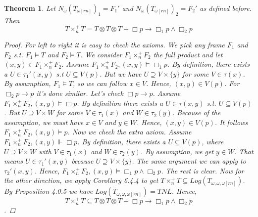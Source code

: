 \documentclass[12pt, a4paper]{scrartcl}
\newtheorem{theorem}[definition]{Theorem}
\begin{document}
    \begin{theorem}
        Let $N_\omega(T_{\omega[rn]})_1 = F_1'$ and $N_\omega(T_{\omega[rn]})_2 = F_2'$ as defined before. Then 
        $$T \times^+_n T = T \otimes T \otimes T + \Box p \rightarrow \Box_1 p \land \Box_2 p$$

        \begin{proof}
            For left to right it is easy to check the axioms. We pick any frame $F_1$ and $F_2$ s.t.
            $F_1 \vDash T$ and $F_2 \vDash T$. We consider $F_1 \times^+_n F_2$ the full product and let $(x,y) \in F_1 \times^+_n F_2$. \newline
            Assume $F_1 \times^+_n F_2,(x,y) \vDash \Box_1 p$. By definition, there exists a $U \in \tau_1'(x,y)$ s.t $U \subseteq V(p)$.
            But we have $U \supseteq V \times \{y\}$ for some $V \in \tau(x)$. By assumption, $F_1 \vDash T$, so we can follow $x \in V$. Hence, $(x,y) \in V(p)$. For $\Box_2p \rightarrow p$ it's done similar. \newline Let's check $\Box p \rightarrow p$.
            Assume $F_1 \times^+_n F_2,(x,y) \vDash \Box p$. By definition there exists a $U \in \tau(x,y)$ s.t. $U \subseteq V(p)$. But $U \supseteq V \times W$ for some $V \in \tau_1(x)$ and $W \in \tau_2(y)$.
            Because of the assumption, we must have $x \in V$ and $y \in W$. Hence, $(x,y) \in V(p)$. It follows $F_1 \times^+_n F_2,(x,y) \vDash p$. \newline
            Now we check the extra axiom.  Assume $F_1 \times^+_n F_2,(x,y) \Vdash \Box p$. By definition, there exists a $U \subseteq V(p)$, where $U \supseteq V \times W$ with $V \in \tau_1(x)$ and $W \in \tau_2(y)$. By assumption, we get $y \in W$. That means $U \in \tau_1'(x,y)$ 
            because $U \supseteq V \times \{y\}$. The same argument we can apply to $\tau_2'(x,y)$. Hence, $F_1 \times^+_n F_2,(x,y) \vDash \Box_1 p \land \Box_2 p$. The rest is clear. \newline
            Now for the other direction, we apply Corollary 6.4.4 to get $T \times^+_n T \subseteq Log(T_{\omega,\omega,\omega[rn]})$. By Proposition 4.0.5 we have
            $Log(T_{\omega,\omega,\omega[rn]}) = TNL$. Hence, 
            $$T \times^+_n T \subseteq T \otimes T \otimes T + \Box p \rightarrow \Box_1 p \land \Box_2 p$$.
            

        \end{proof}
        
    \end{theorem}
\end{document}
